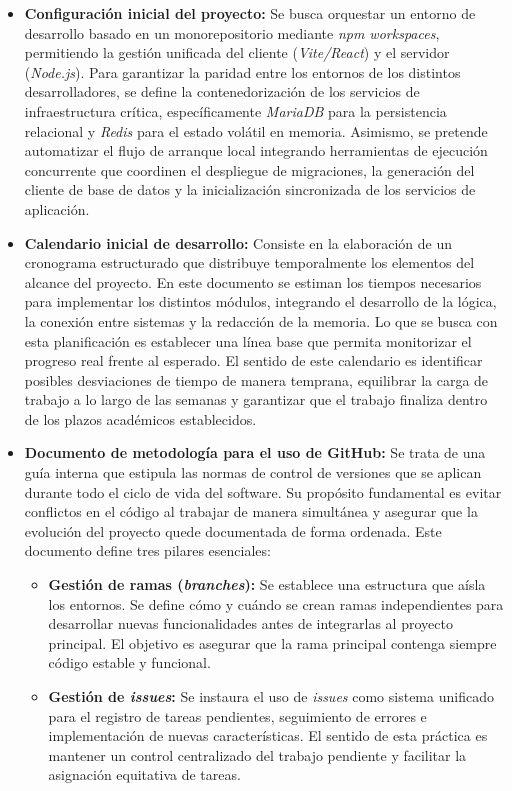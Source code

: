 \begin{itemize}
    \item \textbf{Configuración inicial del proyecto:} Se busca orquestar un entorno de desarrollo basado en un monorepositorio mediante \textit{npm workspaces}, permitiendo la gestión unificada del cliente (\textit{Vite/React}) y el servidor (\textit{Node.js}). Para garantizar la paridad entre los entornos de los distintos desarrolladores, se define la contenedorización de los servicios de infraestructura crítica, específicamente \textit{MariaDB} para la persistencia relacional y \textit{Redis} para el estado volátil en memoria. Asimismo, se pretende automatizar el flujo de arranque local integrando herramientas de ejecución concurrente que coordinen el despliegue de migraciones, la generación del cliente de base de datos y la inicialización sincronizada de los servicios de aplicación.
    \item \textbf{Calendario inicial de desarrollo:} Consiste en la elaboración de un cronograma estructurado que distribuye temporalmente los elementos del alcance del proyecto. En este documento se estiman los tiempos necesarios para implementar los distintos módulos, integrando el desarrollo de la lógica, la conexión entre sistemas y la redacción de la memoria. Lo que se busca con esta planificación es establecer una línea base que permita monitorizar el progreso real frente al esperado. El sentido de este calendario es identificar posibles desviaciones de tiempo de manera temprana, equilibrar la carga de trabajo a lo largo de las semanas y garantizar que el trabajo finaliza dentro de los plazos académicos establecidos.
    \item \textbf{Documento de metodología para el uso de GitHub:} Se trata de una guía interna que estipula las normas de control de versiones que se aplican durante todo el ciclo de vida del software. Su propósito fundamental es evitar conflictos en el código al trabajar de manera simultánea y asegurar que la evolución del proyecto quede documentada de forma ordenada. Este documento define tres pilares esenciales:
    \begin{itemize}
        \item \textbf{Gestión de ramas (\textit{branches}):} Se establece una estructura que aísla los entornos. Se define cómo y cuándo se crean ramas independientes para desarrollar nuevas funcionalidades antes de integrarlas al proyecto principal. El objetivo es asegurar que la rama principal contenga siempre código estable y funcional.
        \item \textbf{Gestión de \textit{issues}:} Se instaura el uso de \textit{issues} como sistema unificado para el registro de tareas pendientes, seguimiento de errores e implementación de nuevas características. El sentido de esta práctica es mantener un control centralizado del trabajo pendiente y facilitar la asignación equitativa de tareas.

\end{itemize}
\end{itemize}

